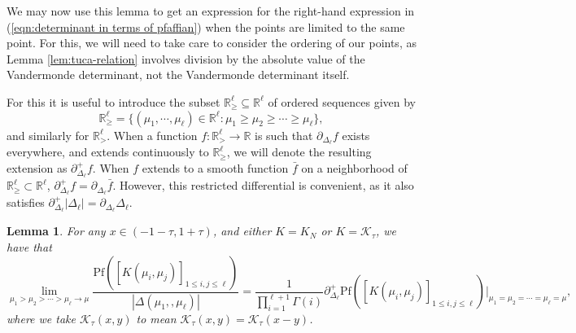 \documentclass[12pt]{article}
\newcommand{\R}{\mathbb{R}}
\newtheorem{lem}[info]{Lemma}
\numberwithin{info}{section}
\numberwithin{equation}{section}
\renewcommand{\[}{\begin{equation}}
\renewcommand{\]}{\end{equation}}
\renewcommand{\cal}{\mathcal}
\newcommand{\<}{\langle}
\renewcommand{\>}{\rangle}
\newcommand{\pf}{\mathrm{Pf}}
\begin{document}
	We may now use this lemma to get an expression for the right-hand expression in (\ref{eqn:determinant in terms of pfaffian}) when the points are limited to the same point. For this, we will need to take care to consider the ordering of our points, as Lemma \ref{lem:tuca-relation} involves division by the absolute value of the Vandermonde determinant, not the Vandermonde determinant itself.
	
	For this it is useful to introduce the subset $\R^\ell_{\ge }\subseteq \R^{\ell}$ of ordered sequences given by
	\[\R^\ell_{\ge }=\{(\mu_1,\cdots, \mu_\ell)\in \R^\ell:\mu_1\ge \mu_2\ge \cdots\ge \mu_\ell\},\]
	and similarly for $\R^{\ell}_{>}$. When a function $f:\R^\ell_{>}\to \R$ is such that $\partial_{\Delta_\ell}f$ exists everywhere, and extends continuously to $\R^\ell_{\ge }$, we will denote the resulting extension as $\partial_{\Delta_\ell}^+f$. When $f$ extends to a smooth function $\bar{f}$ on a neighborhood of $\R_{\ge}^{\ell}\subset \R^\ell$, $\partial_{\Delta_\ell}^+f=\partial_{\Delta_\ell}\bar{f}$. However, this restricted differential is convenient, as it also satisfies $\partial_{\Delta_\ell}^+|\Delta_\ell|=\partial_{\Delta_\ell}\Delta_\ell$.
	
	\begin{lem}
		\label{lem:ratio limit for Kn}
		For any $x\in (-1-\tau,1+\tau)$, and either $K=K_N$ or $K=\cal{K}_\tau$, we have that
		\[\lim_{\mu_1>\mu_2>\cdots>\mu_\ell\to \mu}\frac{\pf([K(\mu_i,\mu_j)]_{1\le i,j\le \ell})}{|\Delta(\mu_1,,\mu_\ell)|}=\frac{1}{\prod_{i=1}^{\ell+1}\Gamma(i)}\partial_{\Delta_\ell}^+\pf([K(\mu_i,\mu_j)]_{1\le i,j\le \ell})\big|_{\mu_1=\mu_2=\cdots=\mu_\ell=\mu},\]
		where we take $\cal{K}_\tau(x,y)$ to mean $\cal{K}_{\tau}(x,y)=\cal{K}_{\tau}(x-y)$.
	\end{lem}
	
\end{document}
